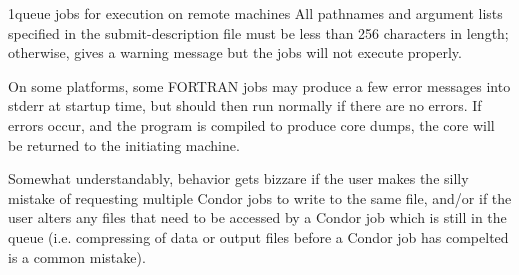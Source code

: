 \begin{ManPage}{}{1}{queue jobs for execution on remote machines}
All pathnames and argument lists specified in the submit-description file must be less than 256 characters in length;
otherwise,  gives a warning message but the jobs will not execute properly. 

On some platforms, some FORTRAN jobs may produce a few error messages into stderr at startup time, but should then run
normally if there are no errors. If errors occur, and the program is compiled to produce core dumps, the core will be returned
to the initiating machine. 

Somewhat understandably, behavior gets bizzare if the user makes the silly mistake of requesting multiple Condor jobs to
write to the same file, and/or if the user alters any files that need to be accessed by a Condor job which is still in the queue
(i.e. compressing of data or output files before a Condor job has compelted is a common mistake). 

\begin{Options}
\end{Options}

\end{ManPage}
